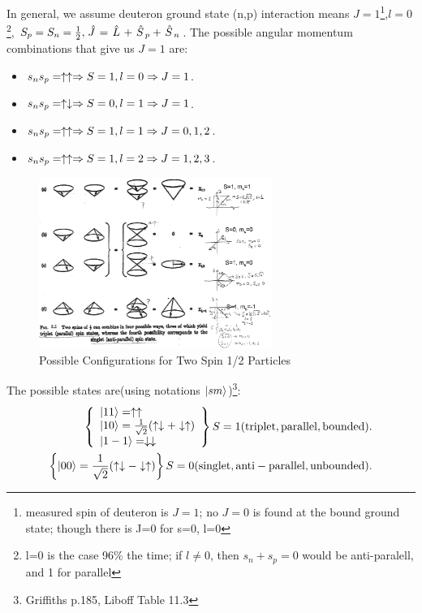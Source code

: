 \documentclass{school-22.101-notes}
\begin{document}
In general, we assume deuteron ground state (n,p) interaction means $J=1$\footnote{measured spin of deuteron is $J=1$; no $J=0$ is found at the bound ground state; though there is J=0 for s=0, l=0},$l=0$\footnote{l=0 is the case 96\% the time; if $l\neq 0$, then $s_n+s_p =0$ would be anti-paralell, and 1 for parallel}, $S_p = S_n = \frac{1}{2}, \left. \hat{J} \right. = \left. \hat{L} \right. + \left. \hat{S} \right._p + \left. \hat{S} \right._n$. The possible angular momentum combinations that give us $J=1$ are: 
\begin{itemize}
\item $s_n s_p = \uparrow \uparrow \Rightarrow S=1, l=0 \Rightarrow J=1 $.
\item $s_n s_p = \uparrow \downarrow \Rightarrow S = 0, l=1 \Rightarrow J=1$. 
\item $s_n s_p = \uparrow \uparrow \Rightarrow S=1, l=1 \Rightarrow J=0,1,2$. 
\item $s_n s_p = \uparrow \uparrow \Rightarrow S=1, l=2 \Rightarrow J = 1,2,3$.
\end{itemize}

\begin{figure}[h!]
    \centering
    \includegraphics[width=3in]{images/deuteron/deuteron-possible-config.png}
    \caption{Possible Configurations for Two Spin 1/2 Particles}
\end{figure}

The possible states are(using notations $\left| s m \right>$)\footnote{Griffiths p.185, Liboff Table 11.3}: 
\begin{align}
\left\{ \begin{array}{l} 
\left| 1 1 \right> = \uparrow \uparrow \\
\left| 1 0 \right> = \frac{1}{\sqrt{2}} (\uparrow \downarrow + \downarrow \uparrow ) \\
\left| 1 -1 \right> = \downarrow \downarrow
\end{array} \right\}
S = 1 (\mathrm{triplet, parallel, bounded}). \\
\left\{ \left| 0 0 \right> = \frac{1}{\sqrt{2}} (\uparrow \downarrow - \downarrow \uparrow ) \right\} 
S = 0 (\mathrm{singlet, anti-parallel, unbounded}).
\end{align}
\end{document}
